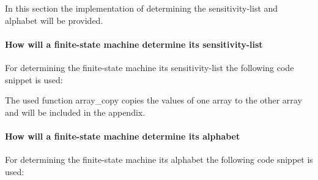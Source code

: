 In this section the implementation of determining the sensitivity-list
and alphabet will be provided.

\hypertarget{how-will-a-finite-state-machine-determine-its-sensitivity-list}{%
\paragraph{How will a finite-state machine determine its
sensitivity-list}\label{how-will-a-finite-state-machine-determine-its-sensitivity-list}}

For determining the finite-state machine its sensitivity-list the
following code snippet is used:

\begin{Shaded}
\begin{Highlighting}[]
\NormalTok{\{}
\NormalTok{\}}
\end{Highlighting}
\end{Shaded}

The used function array\_copy copies the values of one array to the
other array and will be included in the appendix.

\hypertarget{how-will-a-finite-state-machine-determine-its-alphabet}{%
\paragraph{How will a finite-state machine determine its
alphabet}\label{how-will-a-finite-state-machine-determine-its-alphabet}}

For determining the finite-state machine its alphabet the following code
snippet is used:

\begin{Shaded}
\begin{Highlighting}[]
\NormalTok{\{}
    \NormalTok{;}

\NormalTok{    \{}
\NormalTok{        \{}
\NormalTok{            \{}
\NormalTok{            \}}
\NormalTok{        \}}
\NormalTok{    \}}
\NormalTok{\}}
\end{Highlighting}
\end{Shaded}

